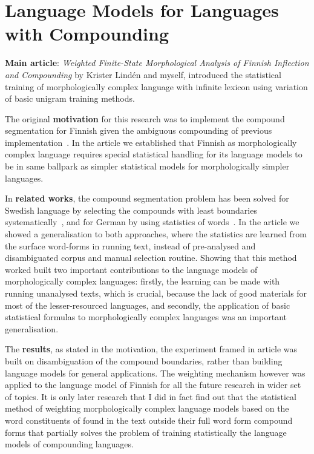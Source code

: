 \documentclass[officiallayout,draft]{unihelcompling}
\begin{document}
\section{Language Models for Languages with Compounding}
\label{sec:compounding}

\textbf{Main article}: \emph{Weighted Finite-State Morphological Analysis of
Finnish Inflection and Compounding}  by Krister
Lindén and myself, introduced the statistical training of morphologically
complex language with infinite lexicon using variation of basic unigram
training methods.

The original \textbf{motivation} for this research was to implement the
compound segmentation for Finnish given the ambiguous compounding of previous
implementation~\citep{pirinen2008suomen}. In the article we established that
Finnish as morphologically complex language requires special statistical
handling for its language models to be in same ballpark as simpler statistical
models for morphologically simpler languages.

In \textbf{related works}, the compound segmentation problem has been solved
for Swedish language by selecting the compounds with least boundaries
systematically~\citep{karlsson1992swetwol}, and for German by using statistics
of words~\citep{schiller2006german}. In the article we showed a generalisation
to both approaches, where the statistics are learned from the surface
word-forms in running text, instead of pre-analysed and disambiguated corpus
and manual selection routine.  Showing that this method worked built two
important contributions to the language models of morphologically complex
languages: firstly, the learning can be made with running unanalysed texts,
which is crucial, because the lack of good materials for most of the
lesser-resourced languages, and secondly, the application of basic statistical
formulas to morphologically complex languages was an important generalisation.

The \textbf{results}, as stated in the motivation, the experiment framed in
article was built on disambiguation of the compound boundaries, rather than
building language models for general applications. The weighting mechanism
however was applied to the language model of Finnish for all the future
research in wider set of topics. It is only later research that I did in fact
find out that the statistical method of weighting morphologically complex
language models based on the word constituents of found in the text outside
their full word form compound forms that partially solves the problem of
training statistically the language models of compounding languages.
\end{document}
